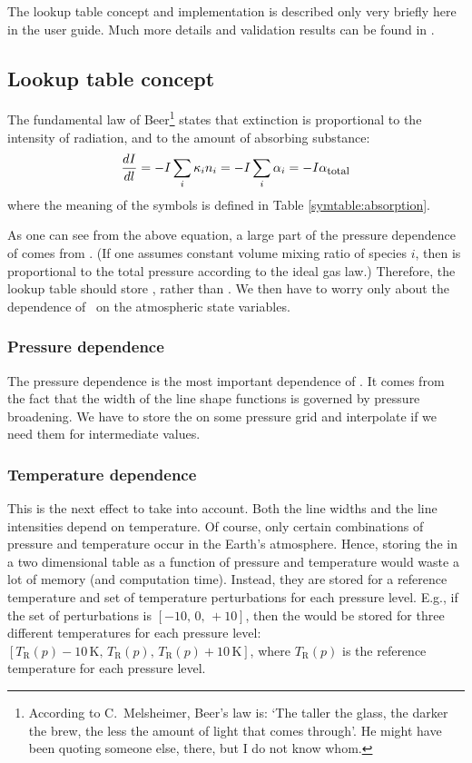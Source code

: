 The lookup table concept and implementation is described only very
briefly here in the user guide. Much more details and validation
results can be found in \citet{buehler:absor:11}.

\subsection{Lookup table concept}

The fundamental law of Beer\footnote{According to C.\ Melsheimer,
  Beer's law is: `The taller the glass, the darker the brew, the less
  the amount of light that comes through'. He might have been quoting
  someone else, there, but I do not know whom.} states that extinction
is proportional to the intensity of radiation, and to the amount of
absorbing substance:
\begin{equation}
  \label{eq:lookup:beer}
  \frac{d I}{d l}
  =
  - I \sum_i {\kappa}_{i} {n}_{i}
  =
  - I \sum_i {\alpha}_{i}
  =
  - I {\alpha}_{\mbox{\footnotesize total}}
\end{equation}
where the meaning of the symbols is defined in Table
\ref{symtable:absorption}. 

As one can see from the above equation, a large part of the pressure
dependence of  comes from . (If one assumes
constant volume mixing ratio of species $i$, then  is
proportional to the total pressure according to the ideal gas law.) 
Therefore, the lookup table should store \AbsXsec, rather than
\AbsCoef. We then have to worry only about the dependence of \AbsXsec\
on the atmospheric state variables.

\subsubsection{Pressure dependence}

The pressure dependence is the most important dependence of
\AbsXsec. It comes from the fact that the width of the line shape
functions is governed by pressure broadening. We have to store the
\aAbsXsec{i} on some pressure grid and interpolate if we need them for
intermediate values.

\subsubsection{Temperature dependence}

This is the next effect to take into account. Both the line widths and
the line intensities depend on temperature. Of course, only certain
combinations of pressure and temperature occur in the Earth's
atmosphere. Hence, storing the  in a two dimensional table
as a function of pressure and temperature would waste a lot of memory (and
computation time).
Instead, they are stored for a reference temperature and set of
temperature perturbations for each pressure level. E.g., if the set of
perturbations is $[-10,\, 0,\, +10]$, then the \aAbsXsec{i} would be stored
for three different temperatures for each pressure level:
$[T_\mathrm{R}(p)-10\,\mbox{K},\, T_\mathrm{R}(p),\, T_\mathrm{R}(p)+10\,\mbox{K}]$, where
$T_\mathrm{R}(p)$ is the reference temperature for each pressure level.

